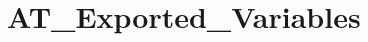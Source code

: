 \hypertarget{group___a_t___exported___variables}{}\section{A\+T\+\_\+\+Exported\+\_\+\+Variables}
\label{group___a_t___exported___variables}
